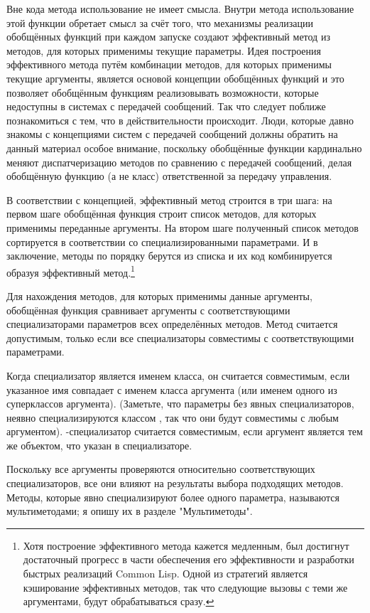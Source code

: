 Вне кода метода использование  не имеет смысла.  Внутри метода
использование этой функции обретает смысл за счёт того, что механизмы реализации
обобщённых функций при каждом запуске создают эффективный метод из методов, для которых
применимы текущие параметры.  Идея построения эффективного метода путём комбинации
методов, для которых применимы текущие аргументы, является основой концепции обобщённых
функций и это позволяет обобщённым функциям реализовывать возможности, которые недоступны
в системах с передачей сообщений.  Так что следует поближе познакомиться с тем, что в
действительности происходит.  Люди, которые давно знакомы с концепциями систем с передачей
сообщений должны обратить на данный материал особое внимание, поскольку обобщённые функции
кардинально меняют диспатчеризацию методов по сравнению с передачей сообщений, делая
обобщённую функцию (а не класс) ответственной за передачу управления.

В соответствии с концепцией, эффективный метод строится в три шага: на первом шаге
обобщённая функция строит список методов, для которых применимы переданные аргументы.  На
втором шаге полученный список методов сортируется в соответствии со специализированными
параметрами.  И в заключение, методы по порядку берутся из списка и их код комбинируется
образуя эффективный метод.\footnote{Хотя построение эффективного метода кажется медленным,
  был достигнут достаточный прогресс в части обеспечения его эффективности и разработки
  быстрых реализаций Common Lisp.  Одной из стратегий является кэширование эффективных
  методов, так что следующие вызовы с теми же аргументами, будут обрабатываться сразу.}

Для нахождения методов, для которых применимы данные аргументы, обобщённая функция
сравнивает аргументы с соответствующими специализаторами параметров всех определённых
методов.  Метод считается допустимым, только если все специализаторы совместимы с
соответствующими параметрами.

Когда специализатор является именем класса, он считается совместимым, если указанное имя
совпадает с именем класса аргумента (или именем одного из суперклассов аргумента).
(Заметьте, что параметры без явных специализаторов, неявно специализируются классом
, так что они будут совместимы с любым аргументом).  -специализатор
считается совместимым, если аргумент является тем же объектом, что указан в
специализаторе.

Поскольку все аргументы проверяются относительно соответствующих специализаторов, все они
влияют на результаты выбора подходящих методов.  Методы, которые явно специализируют более
одного параметра, называются мультиметодами; я опишу их в разделе "Мультиметоды".

